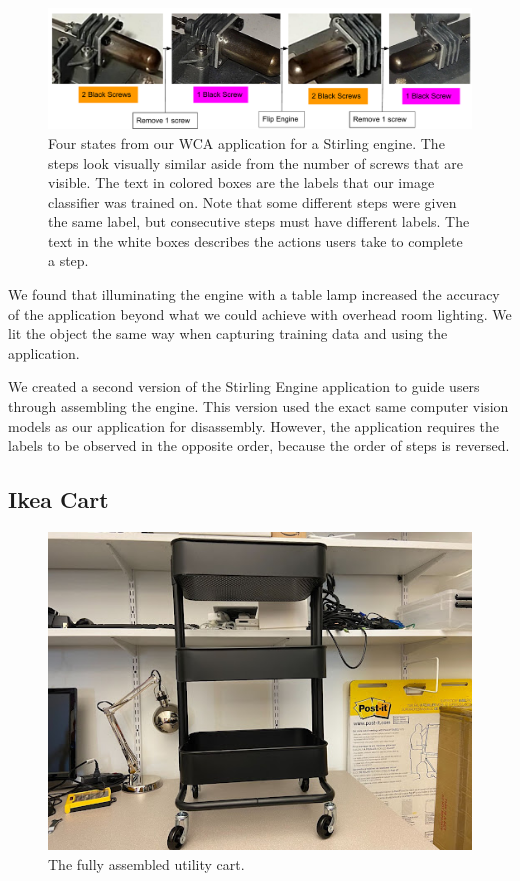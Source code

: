 \begin{figure}
  \includegraphics[width=\columnwidth]{figures/stirling_steps.pdf}
  \caption{Four states from our WCA application for a Stirling engine. The
    steps look visually similar aside from the number of screws that are
    visible. The text in colored boxes are the labels that our image classifier
    was trained on.
    Note that some different steps were given the same label, but consecutive
    steps must have different labels.
    The text in the white boxes describes the actions users take to complete a
    step.
  }\label{fig:stirling_steps}
\end{figure}

We found that illuminating the engine with a table lamp increased the accuracy
of the application beyond what we could achieve with overhead room lighting.
We lit the object the same way when capturing training data and using the
application.

We created a second version of the Stirling Engine application to guide users
through assembling the engine.
This version used the exact same computer vision models as our application for
disassembly.
However, the application requires the labels to be observed in the opposite
order, because the order of steps is reversed.

\subsection{Ikea Cart}\label{sec:ikea_cart}

\begin{figure}
  \includegraphics[width=\textwidth]{figures/full_cart.jpg}
  \caption{
    The fully assembled utility cart.
  }\label{fig:full_cart}
\end{figure}

